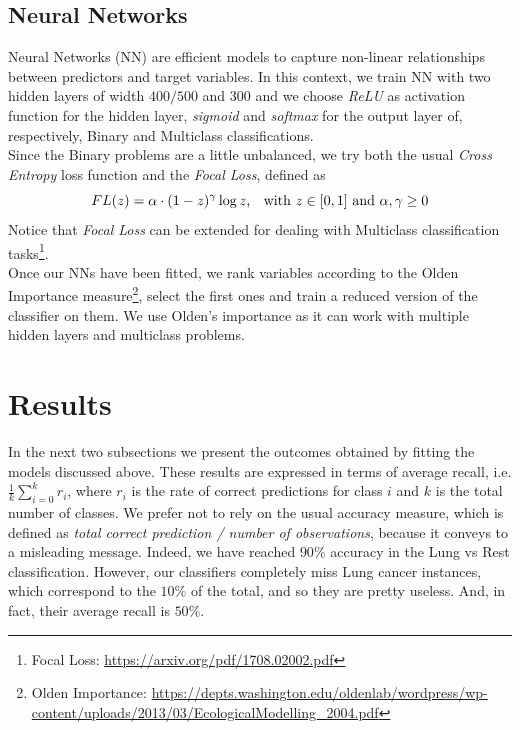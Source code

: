 \documentclass[a4paper,11pt, oneside]{article}  %
\begin{document}
\subsection{Neural Networks}
Neural Networks (NN) are efficient models to capture non-linear relationships between predictors and target variables. In this context, we train NN with two hidden layers of width $400/500$ and $300$ and we choose \textit{ReLU} as activation function for the hidden layer, \textit{sigmoid} and \textit{softmax} for the output layer of, respectively, Binary and Multiclass classifications. \\
Since the Binary problems are a little unbalanced, we try both the usual \textit{Cross Entropy} loss function and the \textit{Focal Loss}, defined as 
\begin{equation*}
	FL(z) = \alpha \cdot (1 - z)^{\gamma} \log{z} \text{,  \hspace{3pt} with }z \in [0,1]  \text{ and } \alpha,  \gamma \geq 0
\end{equation*}
Notice that \textit{Focal Loss} can be extended for dealing with Multiclass classification tasks\footnote{Focal Loss: \url{https://arxiv.org/pdf/1708.02002.pdf}}. \\
Once our NNs have been fitted, we rank variables according to the Olden Importance measure\footnote{Olden Importance: \url{https://depts.washington.edu/oldenlab/wordpress/wp-content/uploads/2013/03/EcologicalModelling_2004.pdf}}, select the first ones and train a reduced version of the classifier on them. We use Olden's importance as it can work with multiple hidden layers and multiclass problems. 

\section{Results}
In the next two subsections we present the outcomes obtained by fitting the models discussed above. These results are expressed in terms of average recall,  i.e.  
$\frac{1}{k} \sum\limits_{i = 0 }^k r_i$,
where $r_i$ is the rate of correct predictions for class $i$ and $k$ is the total number of classes. We prefer not to rely on the usual accuracy measure,  which is defined as \textit{total correct prediction / number of observations}, because it conveys to a misleading message. Indeed, we have reached $90\%$ accuracy in the Lung vs Rest classification. However, our classifiers completely miss Lung cancer instances, which correspond to the $10\%$ of the total, and so they are pretty useless. And, in fact, their average recall is $50\%$.
\end{document}

